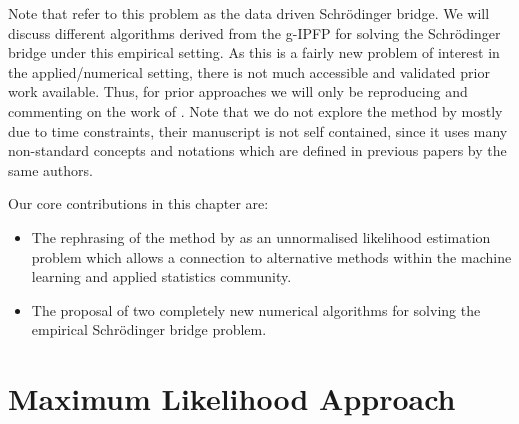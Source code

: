 \documentclass[a4paper,12pt,twoside,openright]{report}
\theoremstyle{definition}
\begin{document}
Note that \cite{pavon2018data} refer to this problem as the data driven Schrödinger bridge. We will discuss different algorithms derived from the g-IPFP for solving the Schrödinger bridge under this empirical setting. As this is a fairly new problem of interest in the applied/numerical setting, there is not much accessible and validated prior work available. Thus, for prior approaches we will only be reproducing and commenting on the work of \cite{pavon2018data}. Note that we do not explore the method by \cite{bernton2019schr} mostly due to time constraints, their manuscript is not self contained, since it uses many non-standard concepts and notations which are defined in previous papers by the same authors.

Our core contributions in this chapter are:

\begin{itemize}
    \item The rephrasing of the method by \cite{pavon2018data} as an unnormalised likelihood estimation problem which allows a connection to alternative methods within the machine learning and applied statistics community.
    \item The proposal of two completely new numerical algorithms for solving the empirical Schrödinger bridge problem.
\end{itemize}



\section{Maximum Likelihood Approach \citep{pavon2018data}}
\end{document}

